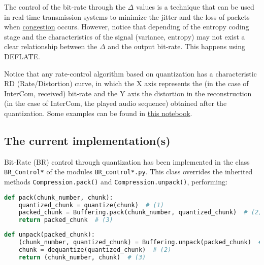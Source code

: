 The control of the bit-rate through the $\Delta$ values is a technique
that can be used in real-time transmission systems to minimize the
jitter and the loss of packets when
\href{https://en.wikipedia.org/wiki/Network_congestion}{congestion}
occurs. However, notice that depending of the entropy coding stage and
the characteristics of the signal (variance, entropy) may not exist a
clear relationship between the $\Delta$ and the output bit-rate. This
happens using DEFLATE.

Notice that any rate-control algorithm based on quantization has a
characteristic RD (Rate/Distortion) curve, in which the X axis
represents the (in the case of InterCom, received) bit-rate and the Y
axis the distortion in the reconstruction (in the case of InterCom,
the played audio sequence) obtained after the quantization. Some
examples can be found
in \href{https://github.com/Tecnologias-multimedia/Tecnologias-multimedia.github.io/blob/master/study_guide/10-br_control/audio_quantization.ipynb}{this
notebook}.

\subsection{The current implementation(s)}
Bit-Rate (BR) control through quantization has been implemented in the
class \verb|BR_Control*| of the modules
\texttt{BR\_control*.py}. This class overrides the inherited
methods \verb|Compression.pack()| and \verb|Compression.unpack()|,
performing:

\begin{lstlisting}[language=Python]
  def pack(chunk_number, chunk):
    quantized_chunk = quantize(chunk)  # (1)
    packed_chunk = Buffering.pack(chunk_number, quantized_chunk)  # (2)
    return packed_chunk  # (3)
\end{lstlisting}

\begin{lstlisting}[language=Python]
  def unpack(packed_chunk):
    (chunk_number, quantized_chunk) = Buffering.unpack(packed_chunk)  # (1)
    chunk = dequantize(quantized_chunk)  # (2)
    return (chunk_number, chunk)  # (3)
\end{lstlisting}

